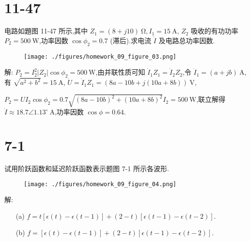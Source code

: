     \section{11-47} 电路如題图 11-47 所示,其中 $Z_1=\left( 8+j 10 \right) \ \mathrm{\Omega},I_1=15 \ \mathrm{A}$, $Z_2$ 吸收的有功功率 $P_2=500 \ \mathrm{W}$,功率因数 $\cos\phi_2=0.7$ (滞后).求电流 $\dot{I}$ 及电路总功率因数.
    \begin{figure}[htbp]
        \centering
        \texttt{[image: ./figures/homework\_09\_figure\_03.png]}
    \end{figure}

    解: $P_2=I_2^2| Z_2 |\cos\phi_2=500 \ \mathrm{W}$,由并联性质可知 $\dot{I}_1Z_1=\dot{I}_2Z_2$,令 $\dot{I}_{1}=\left( a+j b \right) \ \mathrm{A}$,有 $\sqrt{a^2+b ^2}=15 \ \mathrm{A}$, $\dot{U}=\dot{I}_{1}Z_1=\left( 8a-10b+j \left( 10a+8b \right)  \right) \ \mathrm{V}$,

    $P_2=UI_2\cos\phi_2=0.7 \sqrt{\left( 8a-10b \right) ^2 +\left( 10a+8b \right) ^2}I_2=500 \ \mathrm{W}$,联立解得 $\dot{I}\approx 18.7\angle 1.13^{\circ} \ \mathrm{A}$,功率因数 $\cos\phi=0.64$.
    \section{7-1} 试用阶跃函数和延迟阶跃函数表示题图 7-1 所示各波形.
    \begin{figure}[htbp]
        \centering
        \texttt{[image: ./figures/homework\_09\_figure\_04.png]}
    \end{figure}
    解:
    \begin{enumerate}
        \item[(a)] $f=t[\epsilon\left( t \right) -\epsilon\left( t-1 \right) ]+\left( 2-t \right)[\epsilon\left( t-1 \right) -\epsilon\left( t-2 \right) ]$.
        \item[(b)] $f=[\epsilon\left( t \right) -\epsilon\left( t-1 \right) ]+\left( 2-t \right)[\epsilon\left( t-1 \right) -\epsilon\left( t-2 \right) ]$.
    \end{enumerate}
